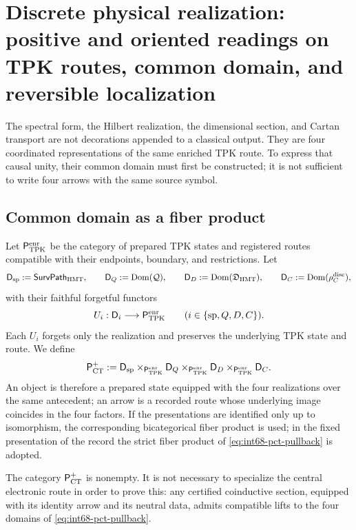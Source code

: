 \section[Discrete physical realization on TPK routes]{Discrete physical realization:
positive and oriented readings on TPK routes, common domain, and
reversible localization}
\label{sec:int68-realizacion-fisica-discreta}

The spectral form, the Hilbert realization, the dimensional section, and Cartan transport are not decorations appended to a classical output. They are four coordinated representations of the same enriched TPK route. To express that causal unity, their common domain must first be constructed; it is not sufficient to write four arrows with the same source symbol.

\subsection{Common domain as a fiber product}

Let \(\mathsf P_{\rm TPK}^{\rm enr}\) be the category of prepared TPK states
and registered routes compatible with their endpoints, boundary, and restrictions.
Let
\[
 \mathsf D_{\rm sp}:=\mathsf{SurvPath}_{\rm HMT},\qquad
 \mathsf D_Q:=\operatorname{Dom}(\mathcal Q),\qquad
 \mathsf D_D:=\operatorname{Dom}(\mathfrak D_{\rm HMT}),\qquad
 \mathsf D_C:=\operatorname{Dom}(\rho_C^{\rm disc}),
\]
with their faithful forgetful functors
\[
 U_i:\mathsf D_i\longrightarrow\mathsf P_{\rm TPK}^{\rm enr}
 \qquad(i\in\{{\rm sp},Q,D,C\}).
\]
Each \(U_i\) forgets only the realization and preserves the underlying TPK state and route.
We define
\begin{equation}
 \mathsf P_{\rm CT}^{+}
 :=
 \mathsf D_{\rm sp}
 \times_{\mathsf P_{\rm TPK}^{\rm enr}}\mathsf D_Q
 \times_{\mathsf P_{\rm TPK}^{\rm enr}}\mathsf D_D
 \times_{\mathsf P_{\rm TPK}^{\rm enr}}\mathsf D_C.
 \label{eq:int68-pct-pullback}
\end{equation}
An object is therefore a prepared state equipped with the four
realizations over the same antecedent; an arrow is a recorded route
whose underlying image coincides in the four factors. If the
presentations are identified only up to isomorphism, the corresponding bicategorical
fiber product is used; in the fixed presentation of the record
the strict fiber product of
\eqref{eq:int68-pct-pullback} is adopted.

\begin{proposition}
\label{prop:int68-pct-no-vacio}
The category \(\mathsf P_{\rm CT}^{+}\) is nonempty. It is not necessary
to specialize the central electronic route in order to prove this: any certified
coinductive section, equipped with its identity arrow and its neutral data, admits
compatible lifts to the four domains of
\eqref{eq:int68-pct-pullback}.
\end{proposition}

